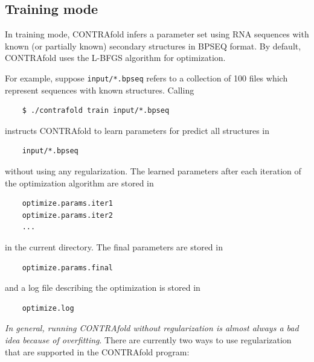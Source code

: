 \documentclass{article}
\begin{document}
  \subsection{Training mode}
  
  In training mode, CONTRAfold infers a parameter set using RNA sequences 
  with known (or partially known) secondary structures in BPSEQ format.  By
  default, CONTRAfold uses the L-BFGS algorithm for optimization.
  
  For example, suppose \texttt{input/*.bpseq} refers to a collection of 100 files
  which represent sequences with known structures.  Calling
  \begin{verbatim}
    $ ./contrafold train input/*.bpseq\end{verbatim}
  instructs CONTRAfold to learn parameters for predict all structures
  in
  \begin{verbatim}
    input/*.bpseq\end{verbatim}
  without using any regularization.  The learned parameters
  after each iteration of the optimization algorithm are stored in 
  \begin{verbatim}
    optimize.params.iter1
    optimize.params.iter2
    ...\end{verbatim}
  in the current directory.  The final parameters are stored in
  \begin{verbatim}
    optimize.params.final\end{verbatim}
  and a log file describing the optimization is stored in
  \begin{verbatim}
    optimize.log
  \end{verbatim}
  \emph{In general, running CONTRAfold without regularization is almost always
  a bad idea because of overfitting}.  There are currently two ways to 
  use regularization that are supported in the CONTRAfold program:  
\end{document}
